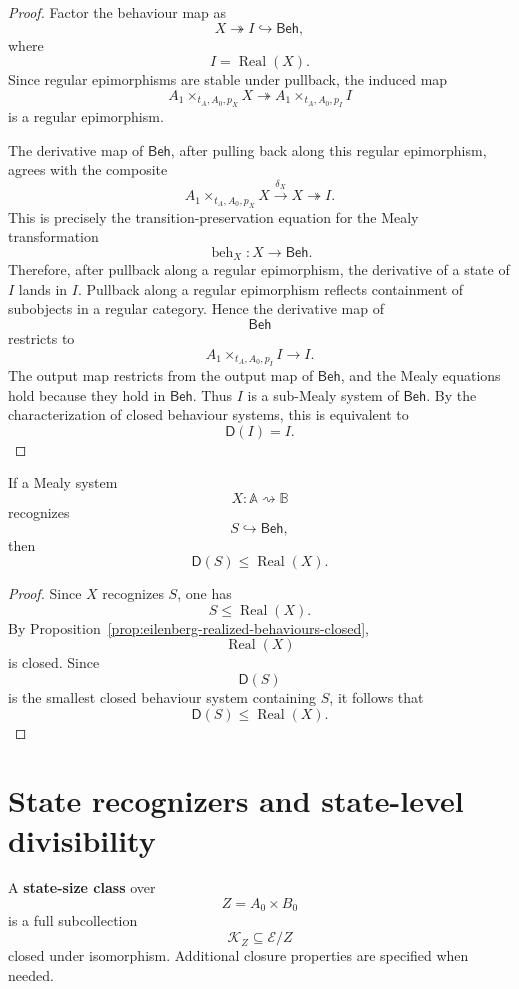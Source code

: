 \begin{proof}
Factor the behaviour map as
\[
X\twoheadrightarrow I\hookrightarrow\mathsf{Beh},
\]
where
\[
I=\operatorname{Real}(X).
\]
Since regular epimorphisms are stable under pullback, the induced map
\[
A_1\times_{t_A,A_0,p_X}X
\twoheadrightarrow
A_1\times_{t_A,A_0,p_I}I
\]
is a regular epimorphism.

The derivative map of \(\mathsf{Beh}\), after pulling back along this regular
epimorphism, agrees with the composite
\[
A_1\times_{t_A,A_0,p_X}X
\xrightarrow{\delta_X}
X
\twoheadrightarrow
I.
\]
This is precisely the transition-preservation equation for the Mealy
transformation
\[
\operatorname{beh}_X:X\to\mathsf{Beh}.
\]
Therefore, after pullback along a regular epimorphism, the derivative of a
state of \(I\) lands in \(I\). Pullback along a regular epimorphism reflects
containment of subobjects in a regular category. Hence the derivative map of
\[
\mathsf{Beh}
\]
restricts to
\[
A_1\times_{t_A,A_0,p_I}I\to I.
\]
The output map restricts from the output map of \(\mathsf{Beh}\), and the
Mealy equations hold because they hold in \(\mathsf{Beh}\). Thus \(I\) is a
sub-Mealy system of \(\mathsf{Beh}\). By the characterization of closed
behaviour systems, this is equivalent to
\[
\mathsf D(I)=I.
\]
\end{proof}

\begin{corollary}
\label{cor:eilenberg-recognition-implies-closure-contained}
If a Mealy system
\[
X:\mathbb A\rightsquigarrow\mathbb B
\]
recognizes
\[
S\hookrightarrow\mathsf{Beh},
\]
then
\[
\mathsf D(S)\leq \operatorname{Real}(X).
\]
\end{corollary}

\begin{proof}
Since \(X\) recognizes \(S\), one has
\[
S\leq\operatorname{Real}(X).
\]
By Proposition~\ref{prop:eilenberg-realized-behaviours-closed},
\[
\operatorname{Real}(X)
\]
is closed. Since
\[
\mathsf D(S)
\]
is the smallest closed behaviour system containing \(S\), it follows that
\[
\mathsf D(S)\leq\operatorname{Real}(X).
\]
\end{proof}

\section{State recognizers and state-level divisibility}
\label{sec:eilenberg-state-recognizers-divisibility}

\begin{definition}
\label{def:eilenberg-state-size-class}
A \textbf{state-size class} over
\[
Z=A_0\times B_0
\]
is a full subcollection
\[
\mathcal K_Z\subseteq\mathcal E/Z
\]
closed under isomorphism. Additional closure properties are specified when
needed.
\end{definition}

